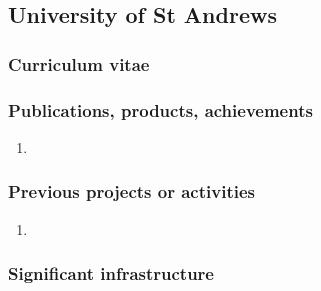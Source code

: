 \subsection*{University of St Andrews}

% 



\subsubsection*{Curriculum vitae}




%

\subsubsection*{Publications, products, achievements}

\begin{enumerate}
\item {}
\end{enumerate}

\subsubsection*{Previous projects or activities}

\begin{enumerate}
\item {}
\end{enumerate}

\subsubsection*{Significant infrastructure}

